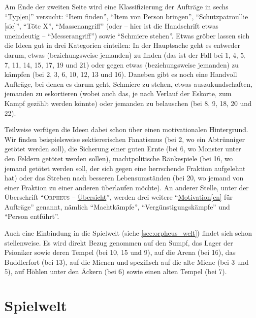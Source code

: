 \documentclass[a5paper,pagesize,numbers=noenddot]{scrbook}
\begin{document}
Am Ende der zweiten Seite wird eine Klassifizierung der Aufträge in sechs \enquote{\uline{Typ[en]}} versucht:
\enquote{Item finden}, \enquote{Item von Person bringen}, \enquote{Schutzpatroullie [sic]}, \enquote{Töte X}, \enquote{Massenangriff} (oder -- hier ist die Handschrift etwas uneindeutig -- \enquote{Messerangriff}) sowie \enquote{Schmiere stehen}.
Etwas gröber lassen sich die Ideen gut in drei Kategorien einteilen:
In der Hauptsache geht es entweder darum, etwas (beziehungsweise jemanden) zu finden (das ist der Fall bei 1, 4, 5, 7, 11, 14, 15, 17, 19 und 21) oder gegen etwas (beziehungsweise jemanden) zu kämpfen (bei 2, 3, 6, 10, 12, 13 und 16).
Daneben gibt es noch eine Handvoll Aufträge, bei denen es darum geht, Schmiere zu stehen, etwas auszukundschaften, jemanden zu eskortieren (wobei auch das, je nach Verlauf der Eskorte, zum Kampf gezählt werden könnte) oder jemanden zu belauschen (bei 8, 9, 18, 20 und 22).

Teilweise verfügen die Ideen dabei schon über einen motivationalen Hintergrund.
Wir finden beispielsweise sektiererischen Fanatismus (bei 2, wo ein Abtrünniger getötet werden soll), die Sicherung einer guten Ernte (bei 6, wo Monster unter den Feldern getötet werden sollen), machtpolitische Ränkespiele (bei 16, wo jemand getötet werden soll, der sich gegen eine herrschende Fraktion aufgelehnt hat) oder das Streben nach besseren Lebensumständen (bei 20, wo jemand von einer Fraktion zu einer anderen überlaufen möchte). An anderer Stelle, unter der Überschrift \enquote{\textsc{Orpheus} -- \uline{Übersicht}}, werden drei weitere \enquote{\uline{Motivation[en]} für Aufträge} genannt, nämlich \enquote{Machtkämpfe}, \enquote{Vergünstigungskämpfe} und \enquote{Person entführt}.

Auch eine Einbindung in die Spielwelt (siehe \autoref{sec:orpheus_welt}) findet sich schon stellenweise.
Es wird direkt Bezug genommen auf den Sumpf, das Lager der Psioniker sowie deren Tempel (bei 10, 15 und 9), auf die Arena (bei 16), das Buddlerfort (bei 13), auf die Mienen und spezifisch auf die alte Miene (bei 3 und 5), auf Höhlen unter den Äckern (bei 6) sowie einen alten Tempel (bei 7).


\section{Spielwelt}\label{sec:orpheus_welt}


\end{document}
